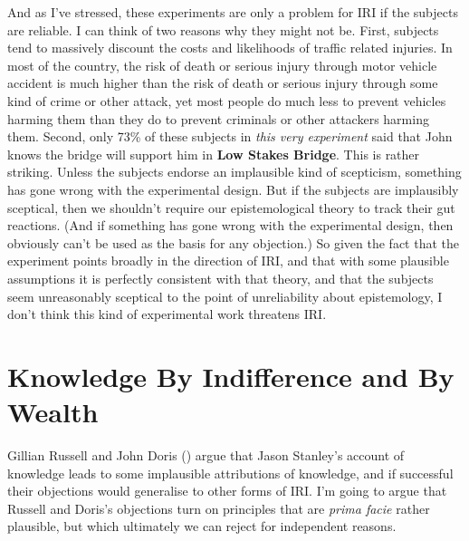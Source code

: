 \documentclass[
  11pt,
  letterpaper,
  DIV=11,
  numbers=noendperiod,
  oneside]{scrartcl}
\begin{document}
And as I've stressed, these experiments are only a problem for IRI if
the subjects are reliable. I can think of two reasons why they might not
be. First, subjects tend to massively discount the costs and likelihoods
of traffic related injuries. In most of the country, the risk of death
or serious injury through motor vehicle accident is much higher than the
risk of death or serious injury through some kind of crime or other
attack, yet most people do much less to prevent vehicles harming them
than they do to prevent criminals or other attackers harming
them. Second, only 73\% of these subjects in \emph{this very
experiment} said that John knows the bridge will support him in
\textbf{Low Stakes Bridge}. This is rather striking. Unless the subjects
endorse an implausible kind of scepticism, something has gone wrong with
the experimental design. But if the subjects are implausibly sceptical,
then we shouldn't require our epistemological theory to track their gut
reactions. (And if something has gone wrong with the experimental
design, then obviously can't be used as the basis for any objection.) So
given the fact that the experiment points broadly in the direction of
IRI, and that with some plausible assumptions it is perfectly consistent
with that theory, and that the subjects seem unreasonably sceptical to
the point of unreliability about epistemology, I don't think this kind
of experimental work threatens IRI.

\section{Knowledge By Indifference and By
Wealth}\label{knowledge-by-indifference-and-by-wealth}

Gillian Russell and John Doris ()
argue that Jason Stanley's account of knowledge leads to some
implausible attributions of knowledge, and if successful their
objections would generalise to other forms of IRI. I'm going to argue
that Russell and Doris's objections turn on principles that are
\emph{prima facie} rather plausible, but which ultimately we can reject
for independent reasons.
\end{document}
